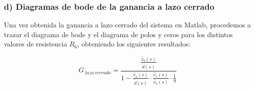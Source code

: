 \documentclass[e4_tp2_main.tex]{subfiles}
\begin{document}
\subsubsection*{d) Diagramas de bode de la ganancia a lazo cerrado }

Una vez obtenida la ganancia a lazo cerrado del sistema en Matlab, procedemos a trazar el diagrama de bode y el diagrama de polos y ceros para los distintos valores de resistencia $R_6$, obteniendo los siguientes resultados:  
  
  \begin{equation}
  G_{\: lazo \:  cerrado}= \frac{\frac{ \widetilde{v_o}(s)}{\widetilde{d}(s)}}{1- \frac{ \widetilde{v_o}(s)}{\widetilde{d}(s)} \cdot \frac{\widetilde{v_c}(s)}{\widetilde{v_o}(s)} \cdot \frac{1}{9} }
  \end{equation}
  
\end{document}
